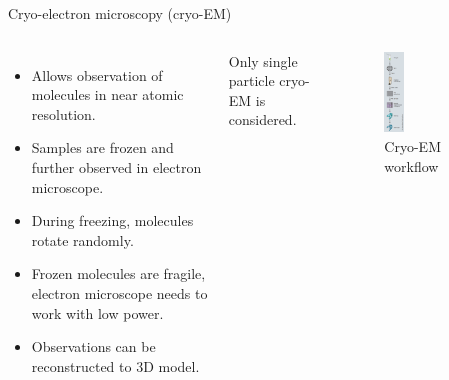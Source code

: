\documentclass[aspectratio=169]{beamer}
\begin{document}
\begin{frame}[c]{Cryo-electron microscopy (cryo-EM)}
    \begin{columns}[c]
            \begin{itemize}
                \item Allows observation of molecules in near atomic resolution.
                \item Samples are frozen and further observed in electron microscope.
                \item During freezing, molecules rotate randomly.
                \item Frozen molecules are fragile, electron microscope needs to work with low power.
                \item Observations can be reconstructed to 3D model.
            \end{itemize}

            \begin{tcolorbox}[colback=red!5!white,hide=<-1>, alert=<2>, colframe=red!75!black]
                Only single particle cryo-EM is considered.
            \end{tcolorbox}
        \begin{figure}
            \includegraphics[width=0.22\textwidth]{cryo-em-workflow.png}
            \caption{Cryo-EM workflow \cite[Figure]{singleParticleCryoEm}}
        \end{figure}
    \end{columns}
\end{frame}
\end{document}
